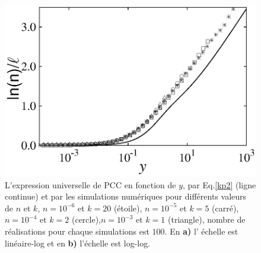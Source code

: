 \begin{figure}[h!]
	\centering
	\includegraphics[scale=1,angle=0]{./figures/fig4-4}
	\caption{L'expression universelle de PCC en fonction de $y$, par Eq.\ref{kp2} (ligne continue) et par les simulations numériques pour différents valeurs de $n$ et $k$, $n=10^{-6}$ et $k=20$ (étoile), $n=10^{-5}$ et $k=5$ (carré), $n=10^{-4}$ et $k=2$ (cercle),$n=10^{-3}$ et $k=1$ (triangle), nombre de réalisations pour chaque simulations est $100$. En \textbf{a)} l' échelle est linéaire-log et en \textbf{b)} l'échelle est log-log.}
	\label{fu}
\end{figure}

